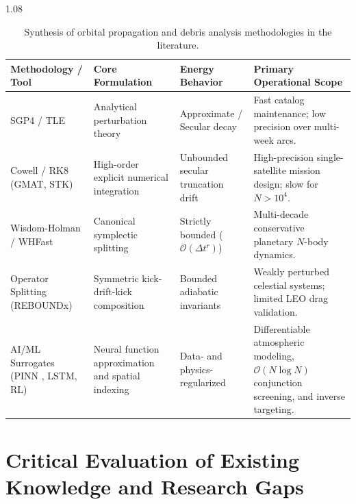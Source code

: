 \begin{table}[htbp]
\centering
\caption{Synthesis of orbital propagation and debris analysis methodologies in the literature.}
\label{tab:sota_synthesis}
\begin{spacing}{1.08}
\small
\begin{tabularx}{\textwidth}{
    >{\raggedright\arraybackslash}p{2.8cm}
    >{\raggedright\arraybackslash}p{3.6cm}
    >{\raggedright\arraybackslash}p{3.1cm}
    >{\raggedright\arraybackslash}X
}
\toprule
\textbf{Methodology / Tool} & \textbf{Core Formulation} & \textbf{Energy Behavior} & \textbf{Primary Operational Scope} \\
\midrule
SGP4 / TLE & Analytical perturbation theory & Approximate / Secular decay & Fast catalog maintenance; low precision over multi-week arcs. \\
\addlinespace[0.4em]
Cowell / RK8 (GMAT, STK) & High-order explicit numerical integration & Unbounded secular truncation drift & High-precision single-satellite mission design; slow for $N > 10^4$. \\
\addlinespace[0.4em]
Wisdom-Holman / WHFast \cite{rein_whfast_2015} & Canonical symplectic splitting & Strictly bounded ($\mathcal{O}(\Delta t^r)$) & Multi-decade conservative planetary $N$-body dynamics. \\
\addlinespace[0.4em]
Operator Splitting (REBOUNDx) & Symmetric kick-drift-kick composition & Bounded adiabatic invariants & Weakly perturbed celestial systems; limited LEO drag validation. \\
\addlinespace[0.4em]
AI/ML Surrogates (PINN \cite{raissi_physics-informed_2019}, LSTM, RL) & Neural function approximation and spatial indexing & Data- and physics-regularized & Differentiable atmospheric modeling, $\mathcal{O}(N \log N)$ conjunction screening, and inverse targeting. \\
\bottomrule
\end{tabularx}
\end{spacing}
\end{table}

\section{Critical Evaluation of Existing Knowledge and Research Gaps}
\label{sec:niche}

